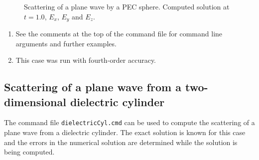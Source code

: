 {
\begin{figure}[hbt]
\newcommand{\figWidth}{5.5cm}
\newcommand{\trimfig}[2]{\trimFig{#1}{#2}{0.1}{0.05}{.05}{.05}}
\begin{center}
\end{center}
\caption{Scattering of a plane wave by a PEC sphere. Computed solution at $t=1.0$, $E_x$, $E_y$ and $E_z$.}
\label{fig:cyl2dScat}
\end{figure}
}

\begin{enumerate}
  \item See the comments at the top of the command file for command line arguments and further examples.
  \item This case was run with fourth-order accuracy.
\end{enumerate}



\clearpage
\subsection{Scattering of a plane wave from a two-dimensional dielectric cylinder} \label{sec:cyl2dDielectricScat}

The command file {\tt dielectricCyl.cmd} can be used to compute the scattering
of a plane wave from a dielectric cylinder. The exact solution is known for this case
and the errors in the numerical solution are determined while the solution
is being computed.


